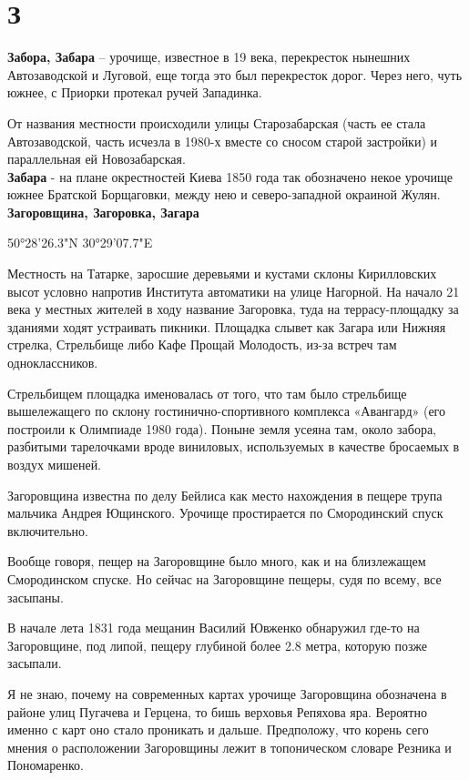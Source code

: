 \chapter*{З}

\textbf{Забора, Забара} – урочище, известное в 19 века, перекресток нынешних Автозаводской и Луговой, еще тогда это был перекресток дорог. Через него, чуть южнее, с Приорки протекал ручей Западинка.

От названия местности происходили улицы Старозабарская (часть ее стала Автозаводской, часть исчезла в 1980-х вместе со сносом старой застройки) и параллельная ей Новозабарская.\\

\textbf{Забара} - на плане окрестностей Киева 1850 года так обозначено некое урочище южнее Братской Борщаговки, между нею и северо-западной окраиной Жулян.\\

\textbf{Загоровщина, Загоровка, Загара}

50°28'26.3"N 30°29'07.7"E

Местность на Татарке, заросшие деревьями и кустами склоны Кирилловских высот условно напротив Института автоматики на улице Нагорной. На начало 21 века у местных жителей в ходу название Загоровка, туда на террасу-площадку за зданиями ходят устраивать пикники. Площадка слывет как Загара или Нижняя стрелка, Стрельбище либо Кафе Прощай Молодость, из-за встреч там одноклассников.

Стрельбищем площадка именовалась от того, что там было стрельбище вышележащего по склону гостинично-спортивного комплекса «Авангард» (его построили к Олимпиаде 1980 года). Поныне земля усеяна там, около забора, разбитыми тарелочками вроде виниловых, используемых в качестве бросаемых в воздух мишеней.

Загоровщина известна по делу Бейлиса как место нахождения в пещере трупа мальчика Андрея Ющинского. Урочище простирается по Смородинский спуск включительно.

Вообще говоря, пещер на Загоровщине было много, как и на близлежащем Смородинском спуске. Но сейчас на Загоровщине пещеры, судя по всему, все засыпаны.

В начале лета 1831 года мещанин Василий Ювженко обнаружил где-то на Загоровщине, под липой, пещеру глубиной более 2.8 метра, которую позже засыпали. 

Я не знаю, почему на современных картах урочище Загоровщина обозначена в районе улиц Пугачева и Герцена, то бишь верховья Репяхова яра. Вероятно именно с карт оно стало проникать и дальше. Предположу, что корень сего мнения о расположении Загоровщины лежит в топоническом словаре Резника и Пономаренко.\\


